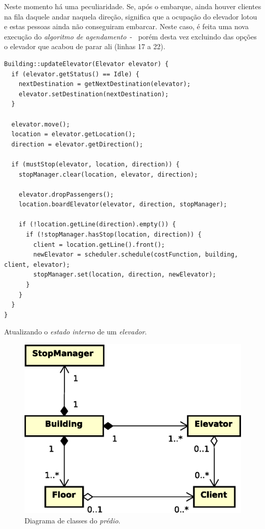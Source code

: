 \begin{description}
    Neste momento há uma peculiaridade. Se, após o embarque, ainda houver
    clientes na fila daquele andar naquela direção, significa que a ocupação do
    elevador lotou e estas pessoas ainda não conseguiram embarcar. Neste caso, é
    feita uma nova execução do \textit{algoritmo de agendamento}~-~ porém desta
    vez excluindo das opções o elevador que acabou de parar ali (linhas 17 a
    22).

    \begin{algorithm}[htb!]
      \centering
        \begin{verbatim}
Building::updateElevator(Elevator elevator) {
  if (elevator.getStatus() == Idle) {
    nextDestination = getNextDestination(elevator);
    elevator.setDestination(nextDestination);
  }

  elevator.move();
  location = elevator.getLocation();
  direction = elevator.getDirection();

  if (mustStop(elevator, location, direction)) {
    stopManager.clear(location, elevator, direction);

    elevator.dropPassengers();
    location.boardElevator(elevator, direction, stopManager);

    if (!location.getLine(direction).empty()) {
      if (!stopManager.hasStop(location, direction)) {
        client = location.getLine().front();
        newElevator = scheduler.schedule(costFunction, building, client, elevator);
        stopManager.set(location, direction, newElevator);
      }
    }
  }
}
        \end{verbatim}
      \caption{Atualizando o \textit{estado interno} de um \textit{elevador}.}
      \label{alg:building:state:update}
    \end{algorithm}
\end{description}

\begin{figure}[htb!]
  \centering
  \includegraphics[scale=0.6]{img/Building}
  \caption{Diagrama de classes do \textit{prédio}.}
\label{fig:diagram:model}
\end{figure}

